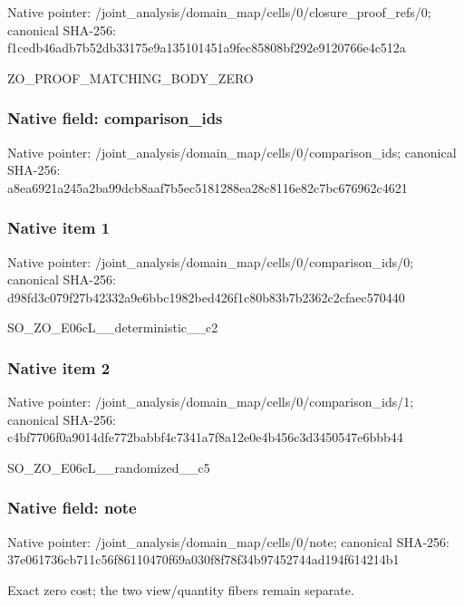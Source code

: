 \documentclass[10pt,a4paper]{article}
\begin{document}
Native pointer: /joint\_analysis/domain\_m\allowbreak{}ap/cells/0/closure\_proof\allowbreak{}\_refs/0; canonical SHA-256: f1cedb46adb7b52db33175e9\allowbreak{}a135101451a9fec85808bf29\allowbreak{}2e9120766e4c512a


ZO\_PROOF\_MATCHING\_BODY\_ZERO


\subsubsection{Native field: comparison\_ids}


Native pointer: /joint\_analysis/domain\_m\allowbreak{}ap/cells/0/comparison\_id\allowbreak{}s; canonical SHA-256: a8ea6921a245a2ba99dcb8aa\allowbreak{}f7b5ec5181288ea28c8116e8\allowbreak{}2c7bc676962c4621



\subsubsection{Native item 1}


Native pointer: /joint\_analysis/domain\_m\allowbreak{}ap/cells/0/comparison\_id\allowbreak{}s/0; canonical SHA-256: d98fd3c079f27b42332a9e6b\allowbreak{}bc1982bed426f1c80b83b7b2\allowbreak{}362c2cfaec570440


SO\_ZO\_E06cL\_\_deterministic\_\_c2


\subsubsection{Native item 2}


Native pointer: /joint\_analysis/domain\_m\allowbreak{}ap/cells/0/comparison\_id\allowbreak{}s/1; canonical SHA-256: c4bf7706f0a9014dfe772bab\allowbreak{}bf4c7341a7f8a12e0e4b456c\allowbreak{}3d3450547e6bbb44


SO\_ZO\_E06cL\_\_randomized\_\_c5


\subsubsection{Native field: note}


Native pointer: /joint\_analysis/domain\_map/cells/0/note; canonical SHA-256: 37e061736cb711c56f861104\allowbreak{}70f69a030f8f78f34b974527\allowbreak{}44ad194f614214b1


Exact zero cost; the two view/quantity fibers remain separate.
\end{document}
